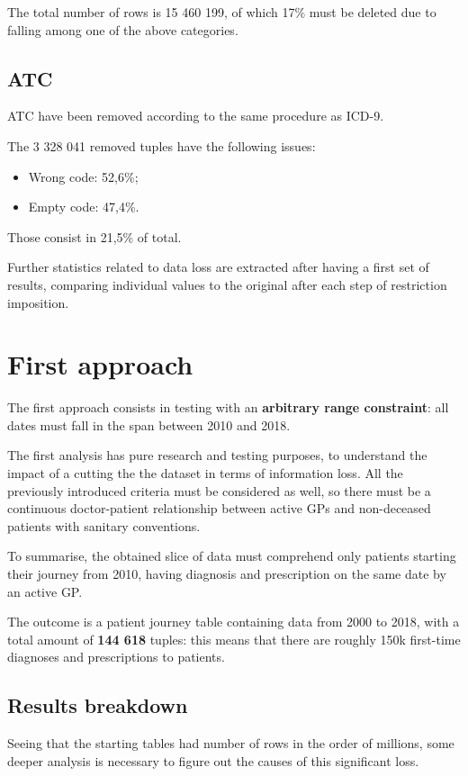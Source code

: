 The total number of rows is 15 460 199, of which 17\% must be deleted due to falling among one of the above categories.

\subsection{ATC}
ATC have been removed according to the same procedure as ICD-9.

The 3 328 041 removed tuples have the following issues:
\begin{itemize}
	\item Wrong code: 52,6\%;
	\item Empty code: 47,4\%.
\end{itemize}

Those consist in 21,5\% of total.

Further statistics related to data loss are extracted after having a first set of results, comparing individual values to the original after each step of restriction imposition. 

\section{First approach}
The first approach consists in testing with an \textbf{arbitrary range constraint}: all dates must fall in the span between 2010 and 2018.

The first analysis has pure research and testing purposes, to understand the impact of a cutting the the dataset in terms of information loss. All the previously introduced criteria must be considered as well, so there must be a continuous doctor-patient relationship between active GPs and non-deceased patients with sanitary conventions.

To summarise, the obtained slice of data must comprehend only patients starting their journey from 2010, having diagnosis and prescription on the same date by an active GP.

The outcome is a patient journey table containing data from 2000 to 2018, with a total amount of \textbf{144 618} tuples: this means that there are roughly 150k first-time diagnoses and prescriptions to patients. 

\subsection{Results breakdown}
Seeing that the starting tables had number of rows in the order of millions, some deeper analysis is necessary to figure out the causes of this significant loss.

